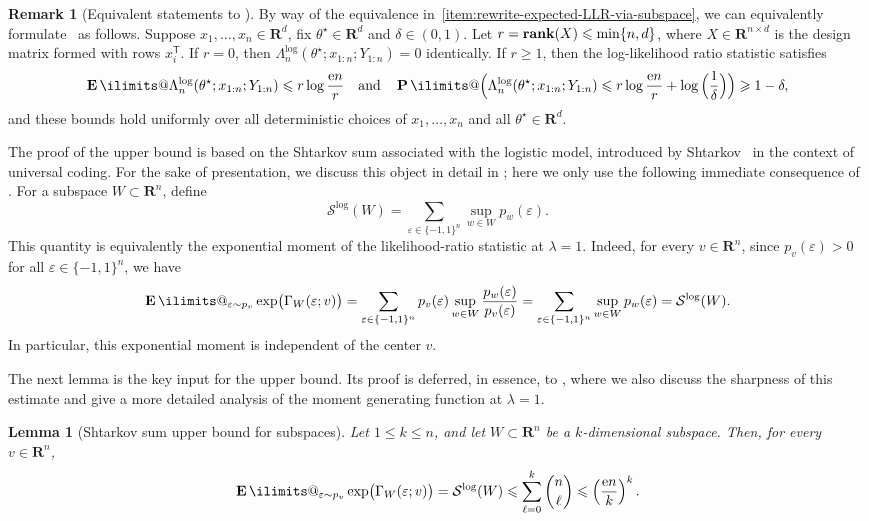 \documentclass[11pt, letterpaper, hidelinks]{article}
\makeatletter
\newcommand{\R}{\mathbf R}
\newcommand{\e}{\mathrm{e}}
\newcommand{\1}{\mathbf 1}
\newcommand{\eps}{\varepsilon}
\renewcommand{\le}{\leqslant}
\renewcommand{\leq}{\leqslant}
\renewcommand{\geq}{\geqslant}
\DeclareMathOperator{\rank}{\bf rank}
\newcommand{\T}{\mathsf{T}}
\newcommand{\E}{\operatorname*{\mathbf{E}}\ilimits@}
\renewcommand{\P}{\operatorname*{\mathbf{P}}\ilimits@}
\theoremstyle{plain}
\newtheorem{lemma}{Lemma}[section]
\theoremstyle{definition}
\newtheorem{remark}{Remark}[section]
\newcommand{\thetastar}{\theta^\star}
\newcommand{\defn}{=}
\makeatother
\begin{document}
\begin{remark}[Equivalent statements to ]
By way of the equivalence in~\ref{item:rewrite-expected-LLR-via-subspace}, 
we can equivalently formulate~ as follows. 
Suppose $x_1, \dots, x_n \in \R^d$, 
fix $\thetastar \in \R^d$ and $\delta \in (0, 1)$. 
Let $r = \rank(X) \leq \min\{n,d\}$, where $X \in \R^{n \times d}$ is the design matrix formed with rows $x_i^\T$.
If $r=0$, then $\Lambda_n^{\operatorname{log}}(\thetastar;x_{1:n};Y_{1:n})=0$ identically. If $r\geq1$, then the log-likelihood ratio statistic satisfies
\[
\E \Lambda_n^{\operatorname{log}}(\thetastar;x_{1:n}; Y_{1:n}) \leq r \log \frac{\e n}{r} \quad \mbox{and} \quad 
\P\Big(\Lambda_n^{\operatorname{log}}(\thetastar;x_{1:n}; Y_{1:n}) \leq r \log \frac{\e n}{r} + \log\Big(\frac{1}{\delta}\Big)\Big) \geq 1-\delta, 
\]
and these bounds hold uniformly over all deterministic 
choices of $x_1,\dots,x_n$ and all $\thetastar \in \R^d$.
\end{remark}

The proof of the upper bound is based on the Shtarkov sum associated with the
logistic model, introduced by Shtarkov~\cite{Shtarkov1987} in the context of
universal coding. For the sake of presentation, we discuss this object in
detail in ; here we only use the following immediate
consequence of . For a subspace \(W\subset \R^n\),
define
\[
\mathcal S^{\operatorname{log}}(W)
\defn
\sum_{\eps\in\{-1,1\}^n}\sup_{w\in W}p_w(\eps).
\]
This quantity is equivalently the exponential moment of the likelihood-ratio
statistic at \(\lambda=1\). Indeed, for every \(v\in\R^n\), since
\(p_v(\eps)>0\) for all \(\eps\in\{-1,1\}^n\), we have
\[
\E_{\eps\sim p_v}\exp\bigl(\Gamma_W(\eps;v)\bigr)
=
\sum_{\eps\in\{-1,1\}^n}
p_v(\eps)
\sup_{w\in W}\frac{p_w(\eps)}{p_v(\eps)}
=
\sum_{\eps\in\{-1,1\}^n}\sup_{w\in W}p_w(\eps)
=
\mathcal S^{\operatorname{log}}(W).
\]
In particular, this exponential moment is independent of the center \(v\).

The next lemma is the key input for the upper bound. Its proof is deferred, in
essence, to , where we also discuss the sharpness of this
estimate and give a more detailed analysis of the moment generating function at
\(\lambda=1\).

\begin{lemma}[Shtarkov sum upper bound for subspaces]
\label{lem:shtarkov-moment-bound-subspaces}
Let \(1\le k\le n\), and let \(W\subset\R^n\) be a \(k\)-dimensional subspace.
Then, for every \(v\in\R^n\),
\[
\E_{\eps\sim p_v}\exp\bigl(\Gamma_W(\eps;v)\bigr)
=
\mathcal S^{\operatorname{log}}(W)
\le
\sum_{\ell=0}^k \binom{n}{\ell}
\le
\left(\frac{\e n}{k}\right)^k .
\]
\end{lemma}
\end{document}
